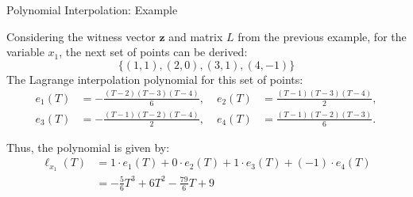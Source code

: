 \documentclass{zkdl-presentation-template}
\begin{document}
    \begin{frame}{Polynomial Interpolation: Example}
        \begin{example}
            Considering the witness vector $\mathbf{z}$ and matrix $L$ from the previous example, for the variable
            $x_1$, the next set of points can be derived:
            \vspace{-10pt}
            \begin{equation*}
                \{(1,1), (2,0), (3,1), (4,-1)\}
            \end{equation*}
            \pause
            The Lagrange interpolation polynomial for this set of points:
            \begin{align*}
                e_1(T) &= -\frac{(T - 2)(T - 3)(T - 4)}{6}, \; &e_2(T) &= \frac{(T - 1)(T - 3)(T - 4)}{2}, \\
                e_3(T) &= -\frac{(T - 1)(T - 2)(T - 4)}{2}, \; &e_4(T) &= \frac{(T - 1)(T - 2)(T - 3)}{6}.
            \end{align*}
            \pause

            Thus, the polynomial is given by:
            \begin{align*}
                \ell_{x_1}(T) &= 1 \cdot e_1(T) + 0 \cdot e_2(T) + 1 \cdot e_3(T) + (-1) \cdot e_4(T) \\
                &= -\frac{5}{6} T^3 + 6T^2 - \frac{79}{6} T + 9
            \end{align*}
        \end{example}
    \end{frame}
\end{document}
